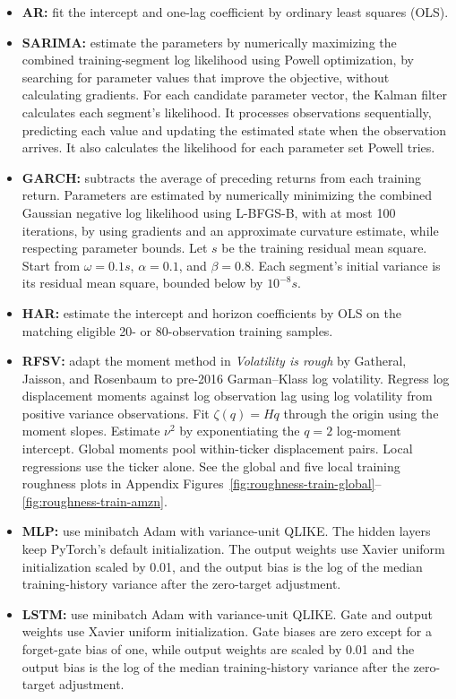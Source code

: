 \documentclass[12pt,a4paper]{article}
\numberwithin{equation}{section}
\numberwithin{table}{section}
\numberwithin{figure}{section}
\begin{document}
\begin{itemize}
    \item \textbf{AR:} fit the intercept and one-lag coefficient by ordinary least squares (OLS).
    \item \textbf{SARIMA:} estimate the parameters by numerically maximizing the combined training-segment log likelihood using Powell optimization, by searching for parameter values that improve the objective, without calculating gradients. For each candidate parameter vector, the Kalman filter calculates each segment's likelihood. It processes observations sequentially, predicting each value and updating the estimated state when the observation arrives. It also calculates the likelihood for each parameter set Powell tries.
    \item \textbf{GARCH:} subtracts the average of preceding returns from each training return. Parameters are estimated by numerically minimizing the combined Gaussian negative log likelihood using L-BFGS-B, with at most 100 iterations, by using gradients and an approximate curvature estimate, while respecting parameter bounds. Let $s$ be the training residual mean square. Start from $\omega=0.1s$, $\alpha=0.1$, and $\beta=0.8$. Each segment's initial variance is its residual mean square, bounded below by $10^{-8}s$.
    \item \textbf{HAR:} estimate the intercept and horizon coefficients by OLS on the matching eligible 20- or 80-observation training samples.
    \item \textbf{RFSV:} adapt the moment method in \emph{Volatility is rough} by Gatheral, Jaisson, and Rosenbaum \cite{gatheral2018} to pre-2016 Garman--Klass log volatility. Regress log displacement moments against log observation lag using log volatility from positive variance observations. Fit $\zeta(q)=Hq$ through the origin using the moment slopes. Estimate $\nu^2$ by exponentiating the $q=2$ log-moment intercept. Global moments pool within-ticker displacement pairs. Local regressions use the ticker alone. See the global and five local training roughness plots in Appendix Figures~\ref{fig:roughness-train-global}--\ref{fig:roughness-train-amzn}.
    \item \textbf{MLP:} use minibatch Adam with variance-unit QLIKE. The hidden layers keep PyTorch's default initialization. The output weights use Xavier uniform initialization scaled by 0.01, and the output bias is the log of the median training-history variance after the zero-target adjustment.
    \item \textbf{LSTM:} use minibatch Adam with variance-unit QLIKE. Gate and output weights use Xavier uniform initialization. Gate biases are zero except for a forget-gate bias of one, while output weights are scaled by 0.01 and the output bias is the log of the median training-history variance after the zero-target adjustment.

\end{itemize}
\end{document}
